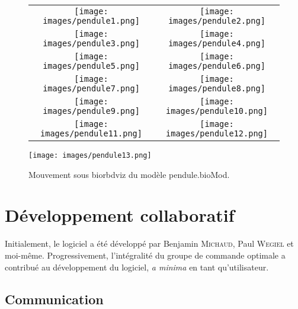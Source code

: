 \begin{figure}[H]
\begin{center}
\begin{tabular}{cc}

\texttt{[image: images/pendule1.png]} & \texttt{[image: images/pendule2.png]} \\
\texttt{[image: images/pendule3.png]} & \texttt{[image: images/pendule4.png]} \\
\texttt{[image: images/pendule5.png]} & \texttt{[image: images/pendule6.png]} \\
\texttt{[image: images/pendule7.png]} & \texttt{[image: images/pendule8.png]} \\
\texttt{[image: images/pendule9.png]} & \texttt{[image: images/pendule10.png]} \\
\texttt{[image: images/pendule11.png]} & \texttt{[image: images/pendule12.png]} \\
\end{tabular}
\end{center}
\end{figure}
 \newpage

\begin{figure}[H]
\begin{center}
\texttt{[image: images/pendule13.png]}
\caption{Mouvement sous \gls{biorbdviz} du modèle pendule.bioMod.}
\end{center}
\end{figure}



        \section{Développement collaboratif} %
        
Initialement, le logiciel a été développé par Benjamin \textsc{Michaud}, Paul \textsc{Wegiel} et moi-même. Progressivement, l'intégralité du groupe de commande optimale a contribué au développement du logiciel, \emph{a minima} en tant qu'utilisateur. 

            \subsection {Communication}
            
